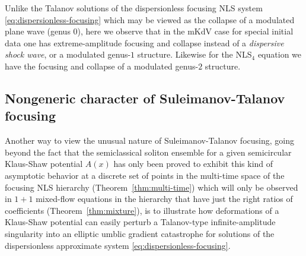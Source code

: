 \documentclass[12pt]{amsart}
\numberwithin{equation}{section}
\begin{document}
\begin{rem}
Unlike the Talanov solutions of the dispersionless focusing NLS system \eqref{eq:dispersionless-focusing} which may be viewed as the collapse of a modulated plane wave (genus $0$), here we observe that in the mKdV case for special initial data one has extreme-amplitude focusing and collapse instead of a \emph{dispersive shock wave}, or a modulated genus-$1$ structure.  Likewise for the NLS$_4$ equation we have the focusing and collapse of a modulated genus-$2$ structure.  
\end{rem}



\subsection{Nongeneric character of Suleimanov-Talanov focusing}
\label{sec-interpolate}
Another way to view the unusual nature of Suleimanov-Talanov focusing, going beyond the fact that the semiclassical soliton ensemble for a given semicircular Klaus-Shaw potential $A(x)$ has only been proved to exhibit this kind of asymptotic behavior at a discrete set of points in the multi-time space of the focusing NLS hierarchy (Theorem~\ref{thm:multi-time}) which will only be observed in $1+1$ mixed-flow equations in the hierarchy that have just the right ratios of coefficients (Theorem~\ref{thm:mixture}), is to illustrate how deformations of a Klaus-Shaw potential can easily perturb a Talanov-type infinite-amplitude singularity into an elliptic umblic gradient catastrophe for solutions of the dispersionless approximate system \eqref{eq:dispersionless-focusing}.  
\end{document}
